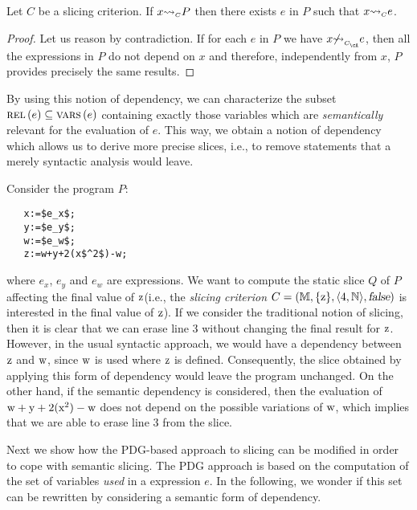 \documentclass[prodmode,acmtocl]{acmsmall}
\def\prog{\ensuremath{P}\xspace}
\def\progq{\ensuremath{Q}\xspace}
\def\memories{\ensuremath{\mathbb{M}}\xspace}
\def\crit{\ensuremath{C}\xspace}
\newcommand{\false}{\mbox{\sl false}}
\def\tuple#1{\langle #1 \rangle}
\newcommand{\0}{\mbox{\bf 0}}
\newcommand{\UNARYFUNCTION}[2]{#1\ifthenelse{\equal{#2}{}}{}{\left(#2\right)}}
\newcommand{\BINARYINFIXFUNCTION}[3]{\ifthenelse{\equal{#2}{}}{}{#2} #1 \ifthenelse{\equal{#3}{}}{}{#3}}
\newcommand{\CODE}[1]{\ensuremath{\mbox{\lstinline!#1!}\xspace}\xspace}
\def\xx{\CODE{x}}
\def\yy{\CODE{y}}
\def\zz{\CODE{z}}
\def\ww{\CODE{w}}
\newcommand{\VARS}[1]{\UNARYFUNCTION{\textsc{vars}}{#1}}
\def\NATURALS{\mathbb{N}}
\def\exp{e}
\newcommand{\CDEPENDS}[3]{\BINARYINFIXFUNCTION{{\rightsquigarrow}_{\mbox{\tiny\sc $#1$}}}{#2}{#3}}
\newcommand{\NCDEPENDS}[3]{\BINARYINFIXFUNCTION{{\not\rightsquigarrow}_{\mbox{\tiny\sc $#1$}}}{#2}{#3}}
\newcommand{\RELEVANT}[1]{\UNARYFUNCTION{\textsc{rel}}{#1}}
\begin{document}
\begin{proposition}\label{prop:approxdep}
  Let $\crit$ be a slicing criterion. If $\CDEPENDS{\crit}{x}{\prog}$
  then there exists $\exp$ in $\prog$ such that
  $\CDEPENDS{\crit}{x}{\exp}$.
\end{proposition} 

\begin{proof}
  Let us reason by contradiction. If for each $\exp$ in $\prog$ we
  have $\NCDEPENDS{\crit_\cA}{x}{\exp}$, then all the expressions in
  $\prog$ do not depend on $x$ and therefore, independently from $x$,
  $\prog$ provides precisely the same results.
\end{proof}

By using this notion of dependency, we can characterize the subset
$\RELEVANT{\exp}\subseteq\VARS{\exp}$ containing exactly those
variables which are \emph{semantically} relevant for the evaluation of
$\exp$.  This way, we obtain a notion of dependency which allows us to
derive more precise slices, i.e., to remove statements that a merely
syntactic analysis would leave.

\begin{example}
  \label{ese1} Consider the program $\prog$: \vspace{-.3cm}
  \begin{lstlisting}
   x:=$e_x$;
   y:=$e_y$; 
   w:=$e_w$;
   z:=w+y+2(x$^2$)-w;
  \end{lstlisting}
  \noindent where $\exp_x$, $\exp_y$ and $\exp_w$ are expressions.  We
  want to compute the static slice $\progq$ of $\prog$ affecting the
  final value of \zz (i.e., the \emph{slicing criterion} $\crit =
  (\memories,\{\mbox{\zz}\},\tuple{4,\NATURALS}, \false)$ is
  interested in the final value of \zz).  If we consider the
  traditional notion of slicing, then it is clear that we can erase
  line 3 without changing the final result for \zz.  However, in the
  usual syntactic approach, we would have a dependency between \zz and
  \ww, since \ww is used where \zz is defined.  Consequently, the
  slice obtained by applying this form of dependency would leave the
  program unchanged.  On the other hand, if the semantic dependency is
  considered, then the evaluation of
  $\mbox{\ww}+\mbox{\yy}+2(\mbox{\xx}^2)-\mbox{\ww}$ does not depend
  on the possible variations of \ww, which implies that we are able to
  erase line 3 from the slice.
\end{example}

Next we show how the PDG-based approach to slicing can be modified in
order to cope with semantic slicing.  The PDG approach is based on the
computation of the set of variables \emph{used} in a expression
$\exp$.  In the following, we wonder if this set can be rewritten by
considering a semantic form of dependency.
\end{document}
